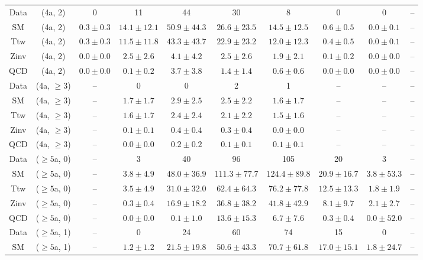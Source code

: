 \begin{table}[h!]
{\begin{tabular}{cccccccccc}
	Data & (4a, 2) & 0 & 11 & 44 & 30 & 8 & 0 & 0 & -- \\[0.5ex] 
	SM & (4a, 2) & $0.3\pm 0.3$ & $14.1\pm 12.1$ & $50.9\pm 44.3$ & $26.6\pm 23.5$ & $14.5\pm 12.5$ & $0.6\pm 0.5$ & $0.0\pm 0.1$ & -- \\[0.5ex] 
	Ttw & (4a, 2) & $0.3\pm 0.3$ & $11.5\pm 11.8$ & $43.3\pm 43.7$ & $22.9\pm 23.2$ & $12.0\pm 12.3$ & $0.4\pm 0.5$ & $0.0\pm 0.1$ & -- \\[0.5ex] 
	Zinv & (4a, 2) & $0.0\pm 0.0$ & $2.5\pm 2.6$ & $4.1\pm 4.2$ & $2.5\pm 2.6$ & $1.9\pm 2.1$ & $0.1\pm 0.2$ & $0.0\pm 0.0$ & -- \\[0.5ex] 
	QCD & (4a, 2) & $0.0\pm 0.0$ & $0.1\pm 0.2$ & $3.7\pm 3.8$ & $1.4\pm 1.4$ & $0.6\pm 0.6$ & $0.0\pm 0.0$ & $0.0\pm 0.0$ & -- \\[0.5ex] 
	Data & (4a, $\ge3$) & -- & 0 & 0 & 2 & 1 & -- & -- & -- \\[0.5ex] 
	SM & (4a, $\ge3$) & -- & $1.7\pm 1.7$ & $2.9\pm 2.5$ & $2.5\pm 2.2$ & $1.6\pm 1.7$ & -- & -- & -- \\[0.5ex] 
	Ttw & (4a, $\ge3$) & -- & $1.6\pm 1.7$ & $2.4\pm 2.4$ & $2.1\pm 2.2$ & $1.5\pm 1.6$ & -- & -- & -- \\[0.5ex] 
	Zinv & (4a, $\ge3$) & -- & $0.1\pm 0.1$ & $0.4\pm 0.4$ & $0.3\pm 0.4$ & $0.0\pm 0.0$ & -- & -- & -- \\[0.5ex] 
	QCD & (4a, $\ge3$) & -- & $0.0\pm 0.0$ & $0.2\pm 0.2$ & $0.1\pm 0.1$ & $0.1\pm 0.1$ & -- & -- & -- \\[0.5ex] 
	Data & ($\ge5$a, 0) & -- & 3 & 40 & 96 & 105 & 20 & 3 & -- \\[0.5ex] 
	SM & ($\ge5$a, 0) & -- & $3.8\pm 4.9$ & $48.0\pm 36.9$ & $111.3\pm 77.7$ & $124.4\pm 89.8$ & $20.9\pm 16.7$ & $3.8\pm 53.3$ & -- \\[0.5ex] 
	Ttw & ($\ge5$a, 0) & -- & $3.5\pm 4.9$ & $31.0\pm 32.0$ & $62.4\pm 64.3$ & $76.2\pm 77.8$ & $12.5\pm 13.3$ & $1.8\pm 1.9$ & -- \\[0.5ex] 
	Zinv & ($\ge5$a, 0) & -- & $0.3\pm 0.4$ & $16.9\pm 18.2$ & $36.8\pm 38.2$ & $41.8\pm 42.9$ & $8.1\pm 9.7$ & $2.1\pm 2.7$ & -- \\[0.5ex] 
	QCD & ($\ge5$a, 0) & -- & $0.0\pm 0.0$ & $0.1\pm 1.0$ & $13.6\pm 15.3$ & $6.7\pm 7.6$ & $0.3\pm 0.4$ & $0.0\pm 52.0$ & -- \\[0.5ex] 
	Data & ($\ge5$a, 1) & -- & 0 & 24 & 60 & 74 & 15 & 0 & -- \\[0.5ex] 
	SM & ($\ge5$a, 1) & -- & $1.2\pm 1.2$ & $21.5\pm 19.8$ & $50.6\pm 43.3$ & $70.7\pm 61.8$ & $17.0\pm 15.1$ & $1.8\pm 24.7$ & -- \\[0.5ex] 

\end{tabular}}
\end{table}
